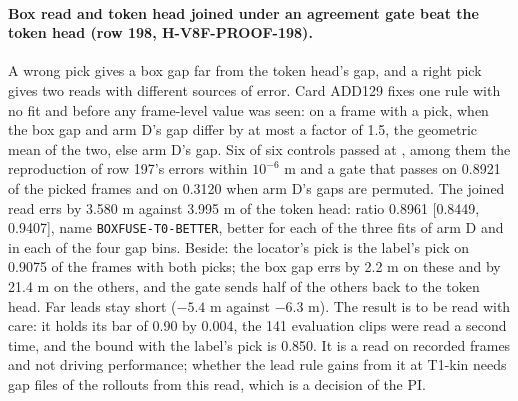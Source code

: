 \paragraph{Box read and token head joined under an agreement gate beat the token head (row 198, H-V8F-PROOF-198).} A wrong pick gives a box gap far from the token head's gap, and a right pick gives two reads with different sources of error. Card ADD129 fixes one rule with no fit and before any frame-level value was seen: on a frame with a pick, when the box gap and arm D's gap differ by at most a factor of 1.5, the geometric mean of the two, else arm D's gap. Six of six controls passed at , among them the reproduction of row 197's errors within $10^{-6}$ m and a gate that passes on 0.8921 of the picked frames and on 0.3120 when arm D's gaps are permuted. The joined read errs by 3.580 m against 3.995 m of the token head: ratio 0.8961 [0.8449, 0.9407], name \texttt{BOXFUSE-T0-BETTER}, better for each of the three fits of arm D and in each of the four gap bins. Beside: the locator's pick is the label's pick on 0.9075 of the frames with both picks; the box gap errs by 2.2 m on these and by 21.4 m on the others, and the gate sends half of the others back to the token head. Far leads stay short ($-5.4$ m against $-6.3$ m). The result is to be read with care: it holds its bar of 0.90 by 0.004, the 141 evaluation clips were read a second time, and the bound with the label's pick is 0.850. It is a read on recorded frames and not driving performance; whether the lead rule gains from it at T1-kin needs gap files of the rollouts from this read, which is a decision of the PI.
